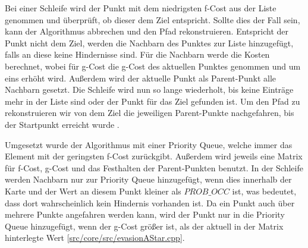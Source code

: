 Bei einer Schleife wird der Punkt mit dem niedrigsten f-Cost aus der Liste genommen und überprüft, ob dieser dem Ziel entspricht. 
Sollte dies der Fall sein, kann der Algorithmus abbrechen und den Pfad rekonstruieren. 
Entspricht der Punkt nicht dem Ziel, werden die Nachbarn des Punktes zur Liste hinzugefügt, falls an diese keine Hindernisse sind. 
Für die Nachbarn werde die Kosten berechnet, wobei für g-Cost die g-Cost des aktuellen Punktes genommen und um eins erhöht wird. 
Außerdem wird der aktuelle Punkt als Parent-Punkt alle Nachbarn gesetzt. 
Die Schleife wird nun so lange wiederholt, bis keine Einträge mehr in der Liste sind oder der Punkt für das Ziel gefunden ist. 
Um den Pfad zu rekonstruieren wir von dem Ziel die jeweiligen Parent-Punkte nachgefahren, bis der Startpunkt erreicht wurde \cite{hartFormalBasisHeuristic1968}. 

Umgesetzt wurde der Algorithmus mit einer Priority Queue, welche immer das Element mit der geringsten f-Cost zurückgibt.
Außerdem wird jeweils eine Matrix für f-Cost, g-Cost und das Festhalten der Parent-Punkten benutzt. 
In der Schleife werden Nachbarn nur zur Priority Queue hinzugefügt, wenn dies innerhalb der Karte und der Wert an diesem Punkt kleiner als \(PROB\_OCC\) ist, 
was bedeutet, dass dort wahrscheinlich kein Hindernis vorhanden ist. 
Da ein Punkt auch über mehrere Punkte angefahren werden kann, wird der Punkt nur in die Priority Queue hinzugefügt, 
wenn der g-Cost größer ist, als der aktuell in der Matrix hinterlegte Wert 
[\href{https://github.com/Jundy0/Studienarbeit/blob/main/src/core/src/evasionAStar.cpp}{src/core/src/evasionAStar.cpp}]. 

